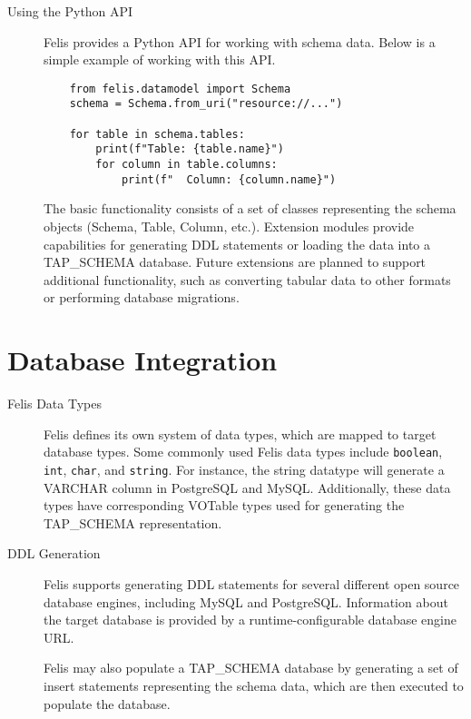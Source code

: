 \documentclass[11pt,twoside]{article}
\begin{document}
\begin{description}
    \item[Using the Python API]
    Felis provides a Python API for working with schema data.
    Below is a simple example of working with this API.
    \begin{verbatim}
    from felis.datamodel import Schema
    schema = Schema.from_uri("resource://...")

    for table in schema.tables:
        print(f"Table: {table.name}")
        for column in table.columns:
            print(f"  Column: {column.name}")
    \end{verbatim}
    The basic functionality consists of a set of classes representing the schema objects (Schema, Table, Column, etc.).
    Extension modules provide capabilities for generating DDL statements or loading the data into a TAP\_SCHEMA database.
    Future extensions are planned to support additional functionality, such as converting tabular data to other formats or performing database migrations.
\end{description}

\section{Database Integration}

\begin{description}
    \item[Felis Data Types]
    Felis defines its own system of data types, which are mapped to target database types.
    Some commonly used Felis data types include \texttt{boolean}, \texttt{int}, \texttt{char}, and \texttt{string}.
    For instance, the string datatype will generate a VARCHAR column in PostgreSQL and MySQL.
    Additionally, these data types have corresponding VOTable types used for generating the TAP\_SCHEMA representation.

\end{description}

\begin{description}
    \item[DDL Generation]
    Felis supports generating DDL statements for several different open source database engines, including MySQL and PostgreSQL.
    Information about the target database is provided by a runtime-configurable database engine URL.

    Felis may also populate a TAP\_SCHEMA database by generating a set of insert statements representing the schema data, which are then executed to populate the database.

\end{description}
\end{document}

